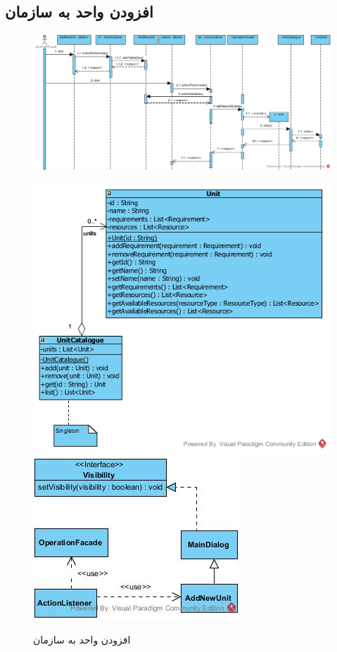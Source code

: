 \begin{landscape}
\newpage
\section{افزودن واحد به سازمان}
\begin{figure}[H]
	\centering
	\includegraphics[scale=0.7]{img/sequence-design/AddUnitToOrganization}
\end{figure}
\begin{figure}[H]
	\centering
	\includegraphics[scale=0.4]{img/sequence-design/AddUnitToOrganizationC}
	\includegraphics[scale=0.6]{img/sequence-design/AddUnitToOrganizationUI}
	\caption{افزودن واحد به سازمان}
\end{figure}


\end{landscape}
